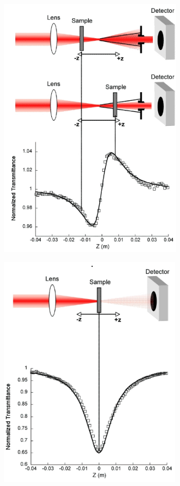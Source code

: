 \documentclass[%
 reprint,
 amsmath,amssymb,
 aps,
]{revtex4-2}
\begin{document}
		\begin{figure}
			\includegraphics[scale = 0.7]{nlr}
			\caption{}
		\end{figure}
		\begin{figure}
			\includegraphics[scale = 0.7]{nla}
			\caption{}
		\end{figure}
\end{document}
